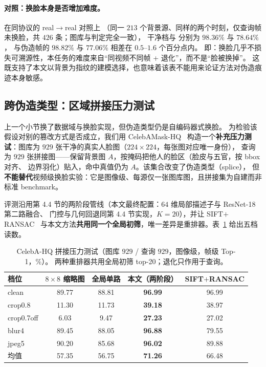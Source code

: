 \paragraph{对照：换脸本身是否增加难度。}在同协议的 real$\rightarrow$real 对照上
（同一 $213$ 个背景源、同样的两个时刻，仅查询帧未换脸，共 $426$ 条；图库与判定完全一致），
干净档与  分别为 $98.36\%$ 与 $78.64\%$，
与伪造帧的 $98.82\%$ 与 $77.06\%$ 相差在 $0.5$–$1.6$ 个百分点内。
即：换脸几乎不损失可溯源性，本任务的难度来自“同视频不同帧 + 退化”，而不是“脸被换掉”。
这既支持了本文以背景为指纹的建模选择，也意味着该表不能用来论证方法对伪造痕迹本身敏感。

\subsection{跨伪造类型：区域拼接压力测试}
\label{sec:splice-exp}

上一个小节换了数据域与换脸实现，但伪造类型仍是自编码器式换脸。
为检验该假设对别的篡改方式是否成立，我们用 CelebAMask-HQ~\cite{lee2019maskgan}
构造一个\textbf{补充压力测试}：图库为 $929$ 张干净的真实人脸图（$224\times224$，每张图对应唯一身份），
查询为 $929$ 张拼接图——保留背景图 $A$，按掩码把他人的脸区（脸皮与五官，按 bbox 对齐、
边界羽化）贴入，命中真值仍为 $A$。该集合改变了伪造类型（splice），
但\textbf{不能替代}视频级换脸实验：它是图像级、每源仅一张图库图，且拼接集为自建而非标准 benchmark。

评测沿用第 4.4 节的两阶段管线（本文最终配置：$64$ 维局部描述子与 ResNet-18 第二路融合、
门控与几何回退同第 4.4 节实现，$K=20$），并让 SIFT$+$RANSAC~\cite{lowe2004sift,fischler1981ransac}
与本文方法\textbf{共用同一个全局初筛}，唯一差异是重排器。表~\ref{tab:splice} 给出五档读数。

\begin{table}[t]
\centering
\caption{CelebA-HQ 拼接压力测试（图库 $929$ / 查询 $929$，图像级，帧级 Top-1，\%）。
两种重排器共用全局初筛 top-20；退化只作用于查询。}
\label{tab:splice}
\small
\begin{tabular}{lcccc}
\toprule
档位 & $8\times8$ 缩略图 & 全局单路 & \textbf{本文（两阶段）} & SIFT$+$RANSAC \\
\midrule
clean      & 89.77 & 88.81 & \textbf{96.99} & 96.99 \\
crop0.8    & 11.30 & 11.73 & \textbf{39.18} & 38.97 \\
crop0.7off & 6.03  & 9.47  & \textbf{27.23} & 27.02 \\
blur4      & 89.45 & 88.05 & \textbf{96.88} & 79.55 \\
jpeg5      & 90.20 & 85.68 & \textbf{96.02} & 89.88 \\
\midrule
均值       & 57.35 & 56.75 & \textbf{71.26} & 66.48 \\
\bottomrule
\end{tabular}
\end{table}

